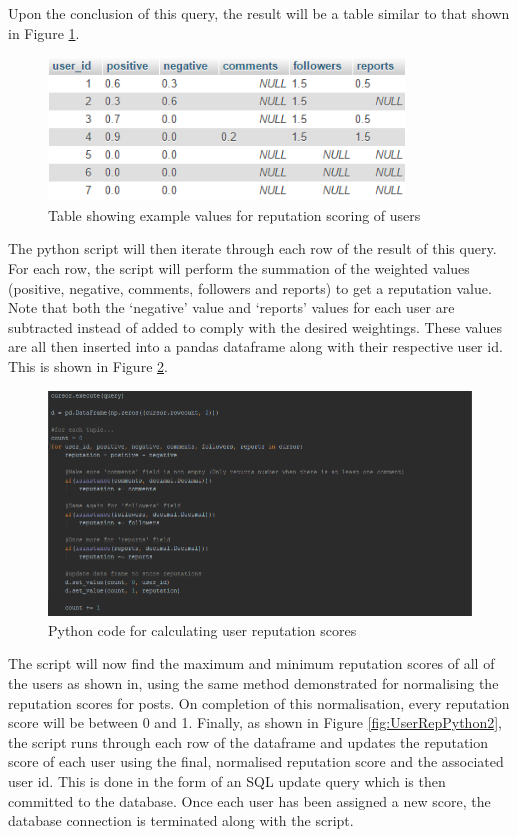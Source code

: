Upon the conclusion of this query, the result will be a table similar to that shown in Figure \ref{fig:UserRepTable}.

\begin{figure}[H]
\centering
\includegraphics[height=1.5in]{Images/Implementation/UserRepTable}
\caption{Table showing example values for reputation scoring of users}
\label{fig:UserRepTable}
\end{figure}

The python script will then iterate through each row of the result of this query. For each row, the script will perform the summation of the weighted values (positive, negative, comments, followers and reports) to get a reputation value. Note that both the `negative' value and `reports' values for each user are subtracted instead of added to comply with the desired weightings. These values are all then inserted into a pandas dataframe \cite{Pandas} along with their respective user id. This is shown in Figure \ref{fig:UserRepPython1}.

\begin{figure}[H]
\centering
\includegraphics[width=\linewidth]{Images/Implementation/UserRepPython1}
\caption{Python code for calculating user reputation scores}
\label{fig:UserRepPython1}
\end{figure}

The script will now find the maximum and minimum reputation scores of all of the users as shown in, using the same method demonstrated for normalising the reputation scores for posts. On completion of this normalisation, every reputation score will be between 0 and 1. Finally, as shown in Figure \ref{fig:UserRepPython2}, the script runs through each row of the dataframe and updates the reputation score of each user using the final, normalised reputation score and the associated user id. This is done in the form of an SQL update query which is then committed to the database. Once each user has been assigned a new score, the database connection is terminated along with the script.

